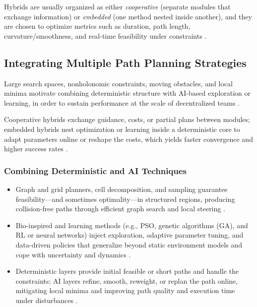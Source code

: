 Hybrids are usually organized as either \emph{cooperative} (separate modules that
exchange information) or \emph{embedded} (one method nested inside another), and
they are chosen to optimize metrics such as duration, path length,
curvature/smoothness, and real-time feasibility under constraints
\cite{abujabal2024path,cheng2018artificial}.

\subsection{Integrating Multiple Path Planning Strategies}

Large search spaces, nonholonomic constraints, moving obstacles, and local minima
motivate combining deterministic structure with AI-based exploration or learning,
in order to sustain performance at the scale of decentralized teams \cite{lin2022review}.

Cooperative hybrids exchange guidance, costs, or partial plans between modules;
embedded hybrids nest optimization or learning inside a deterministic core to
adapt parameters online or reshape the costs, which yields faster convergence and
higher success rates \cite{abujabal2024path}.

\subsubsection{Combining Deterministic and AI Techniques}

\begin{itemize}
  \item {} Graph and grid planners, cell decomposition,
        and sampling guarantee feasibility---and sometimes optimality---in
        structured regions, producing collision-free paths through efficient
        graph search and local steering \cite{lin2022review}.
  \item {} Bio-inspired and learning methods (e.g., PSO,
        genetic algorithms (GA), and RL or neural networks) inject exploration,
        adaptive parameter tuning, and data-driven policies that generalize beyond
        static environment models and cope with uncertainty and dynamics
        \cite{abujabal2024path}.
  \item {} Deterministic layers provide initial feasible or short
        paths and handle the constraints; AI layers refine, smooth, reweight, or
        replan the path online, mitigating local minima and improving path
        quality and execution time under disturbances \cite{lin2022review}.
\end{itemize}

